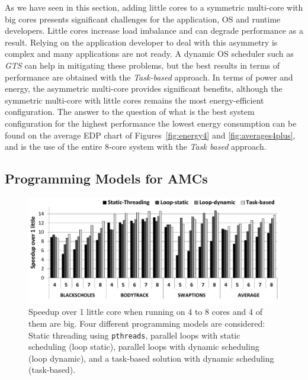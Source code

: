 As we have seen in this section, adding little cores to a symmetric multi-core with big cores 
presents significant challenges for the application, OS and runtime developers. Little cores 
increase load imbalance and can degrade performance as a result. Relying on the application 
developer to deal with this asymmetry is complex and many applications are not ready. A dynamic OS 
scheduler such as \emph{GTS} can help in mitigating these problems, but the best results in terms of 
performance are obtained with the \emph{Task-based} approach. In terms of power and energy, the 
asymmetric multi-core provides significant benefits, although the symmetric multi-core with little 
cores remains the most energy-efficient configuration. The answer to the question of what is the 
best system configuration for the highest performance the lowest energy consumption can be found on 
the average EDP chart of Figures~\ref{fig:energy4} and \ref{fig:averages4plus}, and is the use of 
the entire 8-core system with the \emph{Task based} approach.

\subsection{Programming Models for AMCs}

\begin{figure}
        \centering
        \includegraphics[width=\columnwidth]{figures/speedup-ompssVSopenmp}
        \vspace{-0.cm}
        \caption{Speedup over 1 little core when running on 4 to 8 cores and 4 of them are big. 
Four different programming models are considered: Static threading using \texttt{pthreads}, 
parallel loops with static scheduling (loop static), parallel loops with dynamic scheduling (loop 
dynamic), and a task-based solution with dynamic scheduling (task-based).}%
        \label{fig:prog_models}%
\end{figure}


